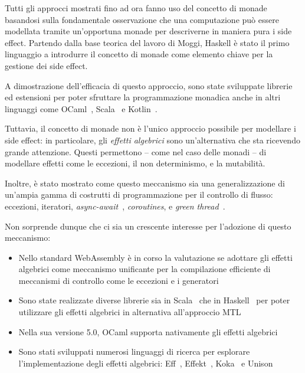Tutti gli approcci mostrati fino ad ora fanno uso del concetto di monade basandosi sulla fondamentale osservazione che una computazione può essere modellata tramite un'opportuna monade per descriverne in maniera pura i side effect.
Partendo dalla base teorica del lavoro di Moggi, Haskell è stato il primo linguaggio a introdurre il concetto di monade come elemento chiave per la gestione dei side effect.

A dimostrazione dell'efficacia di questo approccio, sono state sviluppate librerie ed estensioni per poter sfruttare la programmazione monadica anche in altri linguaggi come OCaml~\cite{cit:ppx-let}, Scala~\cite{cit:zio,cit:cats} e Kotlin~\cite{cit:arrow-monad-comprehensions}.

Tuttavia, il concetto di monade non è l'unico approccio possibile per modellare i side effect: in particolare, gli \emph{effetti algebrici} sono un'alternativa che sta ricevendo grande attenzione.
Questi permettono -- come nel caso delle monadi -- di modellare effetti come le eccezioni, il non determinismo, e la mutabilità\cite{cit:handlers-of-algebraic-effects}.

Inoltre, è stato mostrato come questo meccanismo sia una generalizzazione di un'ampia gamma di costrutti di programmazione per il controllo di flusso: eccezioni, iteratori, \emph{async-await}~\cite{cit:structured-asynchrony-with-algebraic-effects}, \emph{coroutines}, e \emph{green thread}~\cite{cit:algebraic-effect-handlers-go-mainstream}.

Non sorprende dunque che ci sia un crescente interesse per l'adozione di questo meccanismo:
\begin{itemize}
  \item Nello standard WebAssembly è in corso la valutazione se adottare gli effetti algebrici come meccanismo unificante per la compilazione efficiente di meccanismi di controllo come le eccezioni e i generatori~\cite{cit:wasmfx}
  \item Sono state realizzate diverse librerie sia in Scala~\cite{cit:scala-effekt} che in Haskell~\cite{cit:fused-effects,cit:effect-handlers,cit:extensible-effects} per poter utilizzare gli effetti algebrici in alternativa all'approccio MTL
  \item Nella sua versione 5.0, OCaml supporta nativamente gli effetti algebrici~\cite{cit:retrofitting-effect-handlers-onto-ocaml}
  \item Sono stati sviluppati numerosi linguaggi di ricerca per esplorare l'implementazione degli effetti algebrici: Eff~\cite{cit:eff-lang}, Effekt~\cite{cit:effekt-lang}, Koka~\cite{cit:koka-lang} e Unison~\cite{cit:unison-lang}
\end{itemize}
